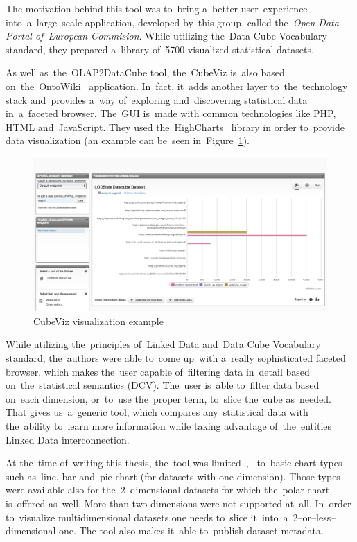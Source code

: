 The motivation behind this tool was to~bring a~better user--experience into~a~large--scale application, developed by~this group, called the~\emph{Open Data Portal of~European Commision}. While utilizing the~Data Cube Vocabulary standard, they 
prepared a~library of~5700 visualized statistical datasets.

\begin{sloppypar}
As well as~the~OLAP2DataCube tool, the~CubeViz is~also based on~the~\mbox{OntoWiki}~\cite{ontowiki}
application. In~fact, it~adds another layer to~the~technology stack and~provides a~way of~exploring and~discovering statistical 
data in~a~faceted browser. The~GUI is~made with common technologies like PHP,
HTML and~JavaScript. They used the~HighCharts~\cite{highcharts} library in
order to~provide data visualization (an example can be~seen in~Figure~\ref{fig:cubeviz}).
\end{sloppypar}

\begin{figure}
	\centering
	\includegraphics[width=140mm]{img/cubeviz.png}
	\caption{CubeViz visualization example}
	\label{fig:cubeviz}
\end{figure}

While utilizing the~principles of~Linked Data and~Data Cube Vocabulary 
standard, the~authors were able to~come up~with a~really sophisticated faceted 
browser, which makes the~user capable of~filtering data in~detail based on~the~statistical 
semantics (DCV). The~user is~able to~filter data based on~each dimension, or~to~use the~proper term, to~slice the~cube as~needed. That gives us~a~generic tool, which 
compares any~statistical data with the~ability to~learn more 
information while taking advantage of~the~entities Linked Data interconnection.

At the~time of~writing this thesis, the~tool was limited~\cite{cubeviz-paper-1},~\cite{cubeviz-paper} to~basic chart types
such as~line, bar and~pie chart (for datasets with one dimension). Those types 
were available also for the~2--dimensional datasets for which the~polar 
chart is~offered as~well. More than two dimensions were not supported at~all. In~order to~visualize 
multidimensional datasets one needs to~slice it~into~a~2--or--less--dimensional one.
The tool also makes it~able to~publish dataset metadata.

